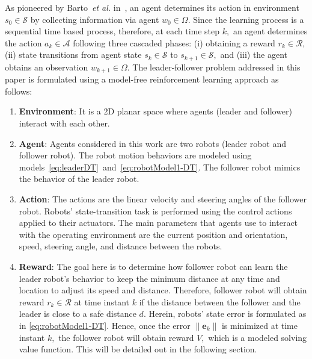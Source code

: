 \documentclass[conference]{IEEEtran}
\begin{document}
%
As pioneered by Barto~\textit{et al.} in~\cite{Barto1983-Neuronlike}, an agent determines its action in environment $s_0 \in \mathcal{S}$ by collecting information via agent $w_0 \in \Omega.$ Since the learning process is a sequential time based process, therefore, at each time step $k,$ an  agent determines  the action $a_k \in \mathcal{A}$ following three cascaded phases: (i) obtaining a reward $r_k \in \mathcal{R},$ %
%
(ii) state transitions from agent state $s_k \in \mathcal{S}$ to $s_{k+1} \in \mathcal{S},$ %
and (iii) the agent obtains an observation $w_{k+1} \in \Omega.$ %
%
The leader-follower problem addressed in this paper is formulated using a model-free reinforcement learning approach as follows: %
%
%
\begin{enumerate}
    \item \textbf{Environment}: It is a 2D planar space where agents (leader and follower) interact with each other.
    \item \textbf{Agent}: Agents considered in this work are two robots (leader robot and follower robot). The robot motion behaviors are modeled using models~\eqref{eq:leaderDT}~and~\eqref{eq:robotModel1-DT}. The follower robot mimics the behavior of the leader robot. %
    \item \textbf{Action}: The actions are the linear velocity and steering angles of the follower robot. Robots' state-transition task is performed using the control actions applied to their actuators. The main parameters that agents use to interact with the operating environment are the current position and orientation, speed, steering angle, and distance between the robots. 
    \item \textbf{Reward}: The goal here is to determine how follower robot can learn the leader robot's behavior to keep the minimum distance at any time and location to adjust its speed and distance. Therefore, follower robot will obtain reward $r_k \in \mathcal{R}$ at time instant $k$ if the distance between the follower and the leader is close to a safe distance $d.$ Herein, robots' state error is formulated as in \eqref{eq:robotModel1-DT}. Hence, once the error $\|\mathbf{e}_k\|$ is minimized at time instant $k,$ the follower robot will obtain reward $V,$ which is a modeled solving value function. This will be detailed out in the following section.
\end{enumerate}
\end{document}
